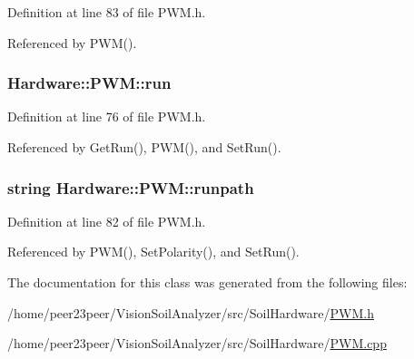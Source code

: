Definition at line 83 of file P\+W\+M.\+h.



Referenced by P\+W\+M().

\hypertarget{class_hardware_1_1_p_w_m_a04531646b41accced24d46046c4bc7de}{}
\subsubsection[{run}]{ Hardware\+::\+P\+W\+M\+::run\hspace{0.3cm}{\ttfamily [private]}}\label{class_hardware_1_1_p_w_m_a04531646b41accced24d46046c4bc7de}


Definition at line 76 of file P\+W\+M.\+h.



Referenced by Get\+Run(), P\+W\+M(), and Set\+Run().

\hypertarget{class_hardware_1_1_p_w_m_ac1eb93467481ee2bd3565f1be47b8a01}{}
\subsubsection[{runpath}]{\setlength{\rightskip}{0pt plus 5cm}string Hardware\+::\+P\+W\+M\+::runpath\hspace{0.3cm}{\ttfamily [private]}}\label{class_hardware_1_1_p_w_m_ac1eb93467481ee2bd3565f1be47b8a01}


Definition at line 82 of file P\+W\+M.\+h.



Referenced by P\+W\+M(), Set\+Polarity(), and Set\+Run().



The documentation for this class was generated from the following files\+:\begin{DoxyCompactItemize}
\item 
/home/peer23peer/\+Vision\+Soil\+Analyzer/src/\+Soil\+Hardware/\hyperlink{_p_w_m_8h}{P\+W\+M.\+h}\item 
/home/peer23peer/\+Vision\+Soil\+Analyzer/src/\+Soil\+Hardware/\hyperlink{_p_w_m_8cpp}{P\+W\+M.\+cpp}\end{DoxyCompactItemize}
